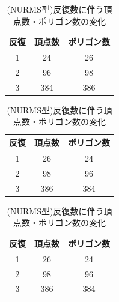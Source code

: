 \documentclass[a4j]{jarticle}
\begin{document}
\begin{table}
  \begin{minipage}{.30\textwidth}
  \caption{(従来型)反復数に伴う頂点数・ポリゴン数の変化}
  \label{table:juurai}
  \centering
  \begin{tabular}{|c|c|c|}
  \hline
  反復 & 頂点数 & ポリゴン数\\
  \hline
  1 & 24 & 26 \\
  2 & 96 & 98 \\
  3 & 384 & 386\\
  \hline
  \end{tabular}
  \end{minipage}
  \hfill
  \begin{minipage}{.30\textwidth}
  \caption{(四角形型)反復数に伴う頂点数・ポリゴン数の変化}
  \label{table:sikaku}
  \centering
  \begin{tabular}{|c|c|c|}
  \hline
  反復 & 頂点数 & ポリゴン数\\
  \hline
  1 & 26 & 24 \\
  2 & 98 & 96 \\
  3 & 386 & 384 \\
  \hline
  \end{tabular}
  \end{minipage}
  \hfill
  \begin{minipage}{.30\textwidth}
  \caption{(NURMS型)反復数に伴う頂点数・ポリゴン数の変化}
  \label{table:nurms}
  \centering
  \begin{tabular}{|c|c|c|}
  \hline
  反復 & 頂点数 & ポリゴン数\\
  \hline
  1 & 26 & 24 \\
  2 & 98 & 96 \\
  3 & 386 & 384 \\
  \hline
  \end{tabular}
  \end{minipage}
\end{table}
%
\newpage
\end{document}
